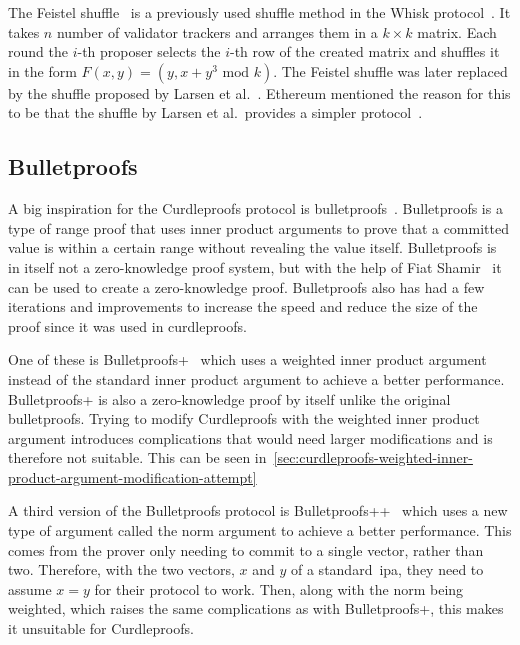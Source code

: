 The Feistel shuffle~\cite{Feistle} is a previously used shuffle method in the Whisk protocol~\cite{Whisk2024}.
It takes $n$ number of validator trackers and arranges them in a $k\times k$ matrix.
Each round the $i$-th proposer selects the $i$-th row of the created matrix and shuffles it in the form $F(x,y)=(y,x+y^3\text{ mod }k)$.
The Feistel shuffle was later replaced by the shuffle proposed by Larsen et al.~\cite{cryptoeprint:2022/560}.
Ethereum mentioned the reason for this to be that the shuffle by Larsen et al.\ provides a simpler protocol~\cite{Whisk2024}.

\subsection{Bulletproofs}\label{subsec:related-work-bulletproofs}
A big inspiration for the Curdleproofs protocol is bulletproofs~\cite{bunz2018bulletproofs}.
Bulletproofs is a type of range proof that uses inner product arguments to prove that a committed value is within a certain range without revealing the value itself.
Bulletproofs is in itself not a zero-knowledge proof system, but with the help of Fiat Shamir~\cite{bunz2018bulletproofs} it can be used to create a zero-knowledge proof.
Bulletproofs also has had a few iterations and improvements to increase the speed and reduce the size of the proof since it was used in curdleproofs.

One of these is Bulletproofs+~\cite{chung2022bulletproofs+} which uses a weighted inner product argument instead of the standard inner product argument to achieve a better performance.
Bulletproofs+ is also a zero-knowledge proof by itself unlike the original bulletproofs.
Trying to modify Curdleproofs with the weighted inner product argument introduces complications that would need larger modifications and is therefore not suitable.
This can be seen in~\autoref{sec:curdleproofs-weighted-inner-product-argument-modification-attempt}

A third version of the Bulletproofs protocol is Bulletproofs++~\cite{eagen2024bulletproofs++} which uses a new type of argument called the norm argument to achieve a better performance.
This comes from the prover only needing to commit to a single vector, rather than two.
Therefore, with the two vectors, $x$ and $y$ of a standard~\gls{ipa}, they need to assume $x=y$ for their protocol to work.
Then, along with the norm being weighted, which raises the same complications as with Bulletproofs+, this makes it unsuitable for Curdleproofs.